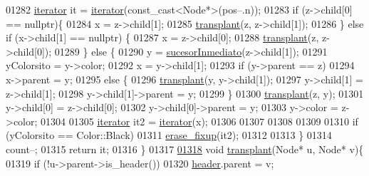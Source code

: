 \begin{DoxyCode}
01282         \hyperlink{classaed2_1_1iterator}{iterator} it = \hyperlink{classaed2_1_1iterator}{iterator}(const\_cast<Node*>(pos--.n));
01283         \textcolor{keywordflow}{if} (z->child[0] == \textcolor{keyword}{nullptr})\{
01284             x = z->child[1];
01285             \hyperlink{classaed2_1_1map_a98b9f200c64ce02dfb67902ee00e375a_a98b9f200c64ce02dfb67902ee00e375a}{transplant}(z, z->child[1]);
01286         \} \textcolor{keywordflow}{else} \textcolor{keywordflow}{if} (x->child[1] == \textcolor{keyword}{nullptr}) \{
01287             x = z->child[0];
01288             \hyperlink{classaed2_1_1map_a98b9f200c64ce02dfb67902ee00e375a_a98b9f200c64ce02dfb67902ee00e375a}{transplant}(z, z->child[0]);
01289         \} \textcolor{keywordflow}{else} \{
01290             y = \hyperlink{classaed2_1_1map_a51169c7d557dc5cf26eac59e6e5e6d98_a51169c7d557dc5cf26eac59e6e5e6d98}{sucesorInmediato}(z->child[1]);
01291             yColorsito = y->color;
01292             x = y->child[1];
01293             \textcolor{keywordflow}{if} (y->parent == z)
01294                 x->parent = y;
01295             \textcolor{keywordflow}{else} \{
01296                 \hyperlink{classaed2_1_1map_a98b9f200c64ce02dfb67902ee00e375a_a98b9f200c64ce02dfb67902ee00e375a}{transplant}(y, y->child[1]);
01297                 y->child[1] = z->child[1];
01298                 y->child[1]->parent = y;
01299             \}
01300             \hyperlink{classaed2_1_1map_a98b9f200c64ce02dfb67902ee00e375a_a98b9f200c64ce02dfb67902ee00e375a}{transplant}(z, y);
01301             y->child[0] = z->child[0];
01302             y->child[0]->parent = y;
01303             y->color = z->color;
01304 
01305             \hyperlink{classaed2_1_1iterator}{iterator} it2 = \hyperlink{classaed2_1_1iterator}{iterator}(x);
01306 
01307 
01308 
01309 
01310             \textcolor{keywordflow}{if} (yColorsito == Color::Black)
01311                 \hyperlink{classaed2_1_1map_a7870c8f26e82b00d0aeb2e9f331dfec6_a7870c8f26e82b00d0aeb2e9f331dfec6}{erase_fixup}(it2);
01312 
01313         \}
01314         count--;
01315         \textcolor{keywordflow}{return} it;
01316     \}
01317 
\hypertarget{map3_8h_source_l01318}{}\hyperlink{classaed2_1_1map_a98b9f200c64ce02dfb67902ee00e375a_a98b9f200c64ce02dfb67902ee00e375a}{01318}         \textcolor{keywordtype}{void} \hyperlink{classaed2_1_1map_a98b9f200c64ce02dfb67902ee00e375a_a98b9f200c64ce02dfb67902ee00e375a}{transplant}(Node* u, Node* v)\{
01319         \textcolor{keywordflow}{if} (!u->parent->is\_header())
01320             \hyperlink{classaed2_1_1map_a92d93f905c8ad73fba18fdc7e8915cce_a92d93f905c8ad73fba18fdc7e8915cce}{header}.parent = v;

\end{DoxyCode}

